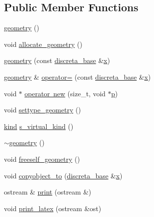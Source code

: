 \subsection*{Public Member Functions}
\begin{DoxyCompactItemize}
\item 
\mbox{\hyperlink{classgeometry_ae58cbd128f60cb06e7d4f59295a6db0d}{geometry}} ()
\item 
void \mbox{\hyperlink{classgeometry_a243e84ff38207957ad5976020c19a033}{allocate\+\_\+geometry}} ()
\item 
\mbox{\hyperlink{classgeometry_adf1960feb5cc97b2d457bfc2d514af23}{geometry}} (const \mbox{\hyperlink{classdiscreta__base}{discreta\+\_\+base}} \&\mbox{\hyperlink{alphabet2_8_c_a6150e0515f7202e2fb518f7206ed97dc}{x}})
\item 
\mbox{\hyperlink{classgeometry}{geometry}} \& \mbox{\hyperlink{classgeometry_af5b78aa94f8ef7f432fb1568187ef762}{operator=}} (const \mbox{\hyperlink{classdiscreta__base}{discreta\+\_\+base}} \&\mbox{\hyperlink{alphabet2_8_c_a6150e0515f7202e2fb518f7206ed97dc}{x}})
\item 
void $\ast$ \mbox{\hyperlink{classgeometry_a9d54b352aeb8544b000c37468a01adc2}{operator new}} (size\+\_\+t, void $\ast$\mbox{\hyperlink{alphabet2_8_c_a533391314665d6bf1b5575e9a9cd8552}{p}})
\item 
void \mbox{\hyperlink{classgeometry_ab4a336baba6a3f56f5ffa053a5be5ba7}{settype\+\_\+geometry}} ()
\item 
\mbox{\hyperlink{discreta_8h_aaf25ee7e2306d78c74ec7bc48f092e81}{kind}} \mbox{\hyperlink{classgeometry_a289c387cc78ff0f0379646cded7648f4}{s\+\_\+virtual\+\_\+kind}} ()
\item 
\mbox{\hyperlink{classgeometry_a2da654e0e19c6145b54727f0f3900a79}{$\sim$geometry}} ()
\item 
void \mbox{\hyperlink{classgeometry_a504b1b52d24b4ae00d9fd0b7838b57e6}{freeself\+\_\+geometry}} ()
\item 
void \mbox{\hyperlink{classgeometry_a3c35255b73911b76347ae549edfb0050}{copyobject\+\_\+to}} (\mbox{\hyperlink{classdiscreta__base}{discreta\+\_\+base}} \&\mbox{\hyperlink{alphabet2_8_c_a6150e0515f7202e2fb518f7206ed97dc}{x}})
\item 
ostream \& \mbox{\hyperlink{classgeometry_af92f963887d22dd3437f585df929208d}{print}} (ostream \&)
\item 
void \mbox{\hyperlink{classgeometry_a1d45497d61d4dc8f7325156158b7e661}{print\+\_\+latex}} (ostream \&ost)
\item 

\end{DoxyCompactItemize}
